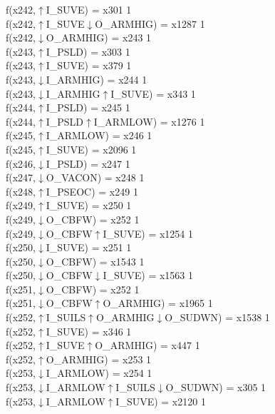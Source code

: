 f(x242,$\uparrow$I\_SUVE) = x301 {1} \\
f(x242,$\uparrow$I\_SUVE$\downarrow$O\_ARMHIG) = x1287 {1} \\
f(x242,$\downarrow$O\_ARMHIG) = x243 {1} \\
f(x243,$\uparrow$I\_PSLD) = x303 {1} \\
f(x243,$\uparrow$I\_SUVE) = x379 {1} \\
f(x243,$\downarrow$I\_ARMHIG) = x244 {1} \\
f(x243,$\downarrow$I\_ARMHIG$\uparrow$I\_SUVE) = x343 {1} \\
f(x244,$\uparrow$I\_PSLD) = x245 {1} \\
f(x244,$\uparrow$I\_PSLD$\uparrow$I\_ARMLOW) = x1276 {1} \\
f(x245,$\uparrow$I\_ARMLOW) = x246 {1} \\
f(x245,$\uparrow$I\_SUVE) = x2096 {1} \\
f(x246,$\downarrow$I\_PSLD) = x247 {1} \\
f(x247,$\downarrow$O\_VACON) = x248 {1} \\
f(x248,$\uparrow$I\_PSEOC) = x249 {1} \\
f(x249,$\uparrow$I\_SUVE) = x250 {1} \\
f(x249,$\downarrow$O\_CBFW) = x252 {1} \\
f(x249,$\downarrow$O\_CBFW$\uparrow$I\_SUVE) = x1254 {1} \\
f(x250,$\downarrow$I\_SUVE) = x251 {1} \\
f(x250,$\downarrow$O\_CBFW) = x1543 {1} \\
f(x250,$\downarrow$O\_CBFW$\downarrow$I\_SUVE) = x1563 {1} \\
f(x251,$\downarrow$O\_CBFW) = x252 {1} \\
f(x251,$\downarrow$O\_CBFW$\uparrow$O\_ARMHIG) = x1965 {1} \\
f(x252,$\uparrow$I\_SUILS$\uparrow$O\_ARMHIG$\downarrow$O\_SUDWN) = x1538 {1} \\
f(x252,$\uparrow$I\_SUVE) = x346 {1} \\
f(x252,$\uparrow$I\_SUVE$\uparrow$O\_ARMHIG) = x447 {1} \\
f(x252,$\uparrow$O\_ARMHIG) = x253 {1} \\
f(x253,$\downarrow$I\_ARMLOW) = x254 {1} \\
f(x253,$\downarrow$I\_ARMLOW$\uparrow$I\_SUILS$\downarrow$O\_SUDWN) = x305 {1} \\
f(x253,$\downarrow$I\_ARMLOW$\uparrow$I\_SUVE) = x2120 {1} \\
